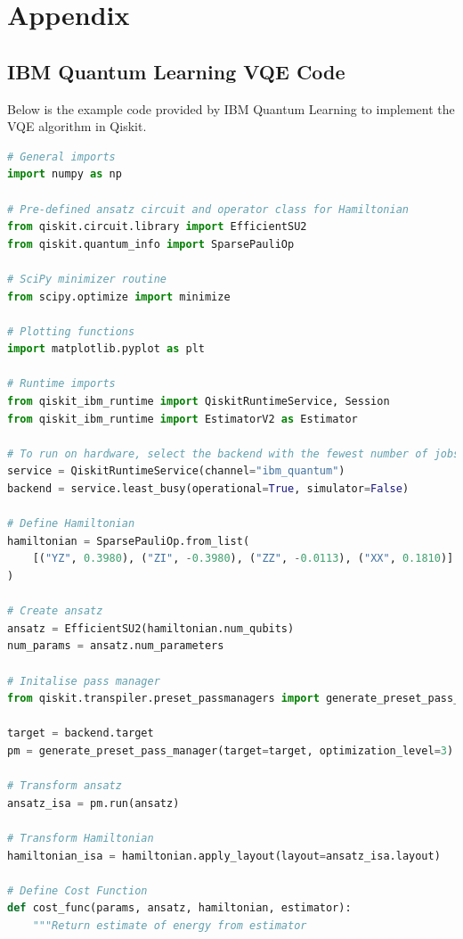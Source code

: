 \documentclass{article}
\begin{document}
\printbibliography

\section{Appendix}

\subsection{IBM Quantum Learning VQE Code}

Below is the example code provided by IBM Quantum Learning to implement the VQE algorithm in Qiskit\cite{Tutorial}.

\begin{lstlisting}[language=Python]
# General imports
import numpy as np

# Pre-defined ansatz circuit and operator class for Hamiltonian
from qiskit.circuit.library import EfficientSU2
from qiskit.quantum_info import SparsePauliOp

# SciPy minimizer routine
from scipy.optimize import minimize

# Plotting functions
import matplotlib.pyplot as plt

# Runtime imports
from qiskit_ibm_runtime import QiskitRuntimeService, Session
from qiskit_ibm_runtime import EstimatorV2 as Estimator

# To run on hardware, select the backend with the fewest number of jobs in the queue
service = QiskitRuntimeService(channel="ibm_quantum")
backend = service.least_busy(operational=True, simulator=False)

# Define Hamiltonian
hamiltonian = SparsePauliOp.from_list(
    [("YZ", 0.3980), ("ZI", -0.3980), ("ZZ", -0.0113), ("XX", 0.1810)]
)

# Create ansatz
ansatz = EfficientSU2(hamiltonian.num_qubits)
num_params = ansatz.num_parameters

# Initalise pass manager
from qiskit.transpiler.preset_passmanagers import generate_preset_pass_manager

target = backend.target
pm = generate_preset_pass_manager(target=target, optimization_level=3)

# Transform ansatz
ansatz_isa = pm.run(ansatz)

# Transform Hamiltonian
hamiltonian_isa = hamiltonian.apply_layout(layout=ansatz_isa.layout)

# Define Cost Function
def cost_func(params, ansatz, hamiltonian, estimator):
    """Return estimate of energy from estimator


\end{lstlisting}
\end{document}
